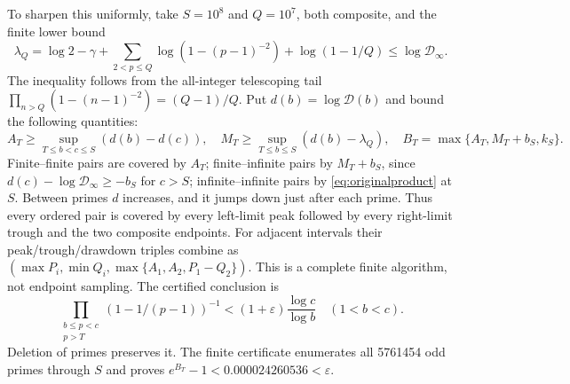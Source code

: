 \documentclass[11pt]{article}
\theoremstyle{remark}\newtheorem{remark}[theorem]{Remark}
\newcommand{\eps}{\varepsilon}
\begin{document}
To sharpen this uniformly, take $S=10^8$ and $Q=10^7$, both composite,
and the finite lower bound
\[
\lambda_Q=\log2-\gamma+\sum_{2<p\le Q}\log(1-(p-1)^{-2})
+\log(1-1/Q)\le\log\mathscr D_\infty.
\]
The inequality follows from the all-integer telescoping tail
$\prod_{n>Q}(1-(n-1)^{-2})=(Q-1)/Q$.
Put $d(b)=\log\mathscr D(b)$ and bound the following quantities:
\[
A_T\ge\sup_{T\le b<c\le S}(d(b)-d(c)),\quad
M_T\ge\sup_{T\le b\le S}(d(b)-\lambda_Q),\quad
B_T=\max\{A_T,M_T+b_S,k_S\}.
\]
Finite--finite pairs are covered by $A_T$; finite--infinite pairs by
$M_T+b_S$, since $d(c)-\log\mathscr D_\infty\ge-b_S$ for $c>S$;
infinite--infinite pairs by \eqref{eq:originalproduct} at $S$.
Between primes $d$ increases, and it jumps down just after each prime.
Thus every ordered pair is covered by every left-limit peak followed by
every right-limit trough and the two composite endpoints.
For adjacent intervals their peak/trough/drawdown triples combine as
$(\max P_i,\min Q_i,\max\{A_1,A_2,P_1-Q_2\})$.
This is a complete finite algorithm, not endpoint sampling.
The certified conclusion is
\begin{equation}\label{eq:uniformproduct}
\prod_{\substack{b\le p<c\\p>T}}(1-1/(p-1))^{-1}
<(1+\eps)\frac{\log c}{\log b}\quad(1<b<c).
\end{equation}
Deletion of primes preserves it. The finite certificate enumerates all
5761454 odd primes through $S$ and proves
$e^{B_T}-1<0.000024260536<\eps$.
\end{document}
